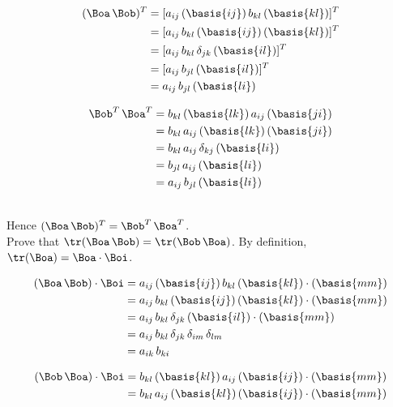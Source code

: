 \documentclass[a4paper,twosided,11pt,DIV15]{scrartcl}
\begin{document}
\begin{enumerate}[(a)]
\begin{minipage}{0.5\textwidth}
\begin{align*}
    (\Boa\,\Bob)^T &= [a_{ij}\,(\basis{ij})\,b_{kl}\,(\basis{kl})]^T\\
    &= [a_{ij}\,b_{kl}\,(\basis{ij})\,(\basis{kl})]^T \\
    &= [a_{ij}\,b_{kl}\,\delta_{jk}\,(\basis{il})]^T\\
    &= [a_{ij}\,b_{jl}\,(\basis{il})]^T\\
    &= a_{ij}\,b_{jl}\,(\basis{li})
  \end{align*}
\end{minipage}
\begin{minipage}{0.5\textwidth}
\begin{align*}
    \Bob^T\,\Boa^T &= b_{kl}\,(\basis{lk})\,a_{ij}\,(\basis{ji})\\
    &= b_{kl}\,a_{ij}\,(\basis{lk})\,(\basis{ji}) \\
    &= b_{kl}\,a_{ij}\,\delta_{kj}\,(\basis{li})\\
    &= b_{jl}\,a_{ij}\,(\basis{li}) \\
    &= a_{ij}\,b_{jl}\,(\basis{li})
  \end{align*}
\end{minipage}
\\[1em] Hence $(\Boa\,\Bob)^T=\Bob^T\,\Boa^T$.
\\Prove that $\tr(\Boa\,\Bob)=\tr(\Bob\,\Boa)$. By definition,
$\tr(\Boa)=\Boa\cdot \Boi$.\\
\begin{minipage}{0.5\textwidth}
\begin{align*}
    (\Boa\,\Bob)\cdot \Boi &= a_{ij}\,(\basis{ij})\,b_{kl}\,(\basis{kl})\cdot(\basis{mm})\\
    &= a_{ij}\,b_{kl}\,(\basis{ij})\,(\basis{kl})\cdot(\basis{mm}) \\
    &= a_{ij}\,b_{kl}\,\delta_{jk}\,(\basis{il})\cdot(\basis{mm})\\
    &= a_{ij}\,b_{kl}\,\delta_{jk}\,\delta_{im}\,\delta_{lm}\\
    &= a_{ik}\,b_{ki}
  \end{align*}
\end{minipage}
\begin{minipage}{0.5\textwidth}
\begin{align*}
    (\Bob\,\Boa)\cdot \Boi &= b_{kl}\,(\basis{kl})\,a_{ij}\,(\basis{ij})\cdot(\basis{mm})\\
    &= b_{kl}\,a_{ij}\,(\basis{kl})\,(\basis{ij})\cdot(\basis{mm}) \\

\end{align*}
\end{minipage}
\end{enumerate}
\end{document}
